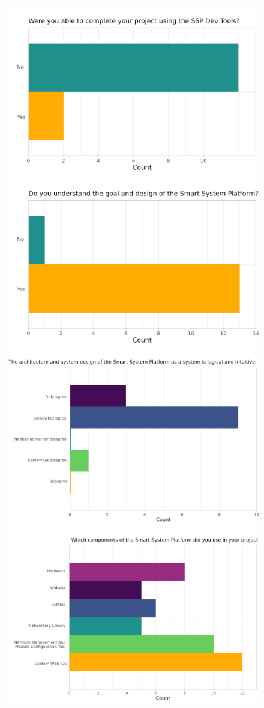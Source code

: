 \begin{figure}[H]
    \centering
    \includegraphics[width=.4\linewidth]{rstudio/survey/plots/completion.png}
    \includegraphics[width=.4\linewidth]{rstudio/survey/plots/logic.png}
    \includegraphics[width=.49\linewidth]{rstudio/survey/plots/architecture.png}
    \includegraphics[width=.49\linewidth]{rstudio/survey/plots/component.png}\\


\end{figure}
